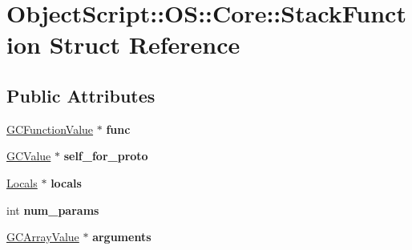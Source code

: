 \hypertarget{struct_object_script_1_1_o_s_1_1_core_1_1_stack_function}{}\section{Object\+Script\+:\+:OS\+:\+:Core\+:\+:Stack\+Function Struct Reference}
\label{struct_object_script_1_1_o_s_1_1_core_1_1_stack_function}
\subsection*{Public Attributes}
\begin{DoxyCompactItemize}
\item 
\hyperlink{struct_object_script_1_1_o_s_1_1_core_1_1_g_c_function_value}{G\+C\+Function\+Value} $\ast$ {\bfseries func}\hypertarget{struct_object_script_1_1_o_s_1_1_core_1_1_stack_function_a6fecb980a2a50cff481043099bfb30a7}{}\label{struct_object_script_1_1_o_s_1_1_core_1_1_stack_function_a6fecb980a2a50cff481043099bfb30a7}

\item 
\hyperlink{struct_object_script_1_1_o_s_1_1_core_1_1_g_c_value}{G\+C\+Value} $\ast$ {\bfseries self\+\_\+for\+\_\+proto}\hypertarget{struct_object_script_1_1_o_s_1_1_core_1_1_stack_function_abcc78ff2d35b35f0fa3d39b877d9994b}{}\label{struct_object_script_1_1_o_s_1_1_core_1_1_stack_function_abcc78ff2d35b35f0fa3d39b877d9994b}

\item 
\hyperlink{struct_object_script_1_1_o_s_1_1_core_1_1_locals}{Locals} $\ast$ {\bfseries locals}\hypertarget{struct_object_script_1_1_o_s_1_1_core_1_1_stack_function_a8379ca86ac22866f787474670996e69b}{}\label{struct_object_script_1_1_o_s_1_1_core_1_1_stack_function_a8379ca86ac22866f787474670996e69b}

\item 
int {\bfseries num\+\_\+params}\hypertarget{struct_object_script_1_1_o_s_1_1_core_1_1_stack_function_a01e0278836dceb775e778021892c4c88}{}\label{struct_object_script_1_1_o_s_1_1_core_1_1_stack_function_a01e0278836dceb775e778021892c4c88}

\item 
\hyperlink{struct_object_script_1_1_o_s_1_1_core_1_1_g_c_array_value}{G\+C\+Array\+Value} $\ast$ {\bfseries arguments}\hypertarget{struct_object_script_1_1_o_s_1_1_core_1_1_stack_function_a88932de399af7753e6b1c50e2ebbeb4b}{}\label{struct_object_script_1_1_o_s_1_1_core_1_1_stack_function_a88932de399af7753e6b1c50e2ebbeb4b}


\end{DoxyCompactItemize}
